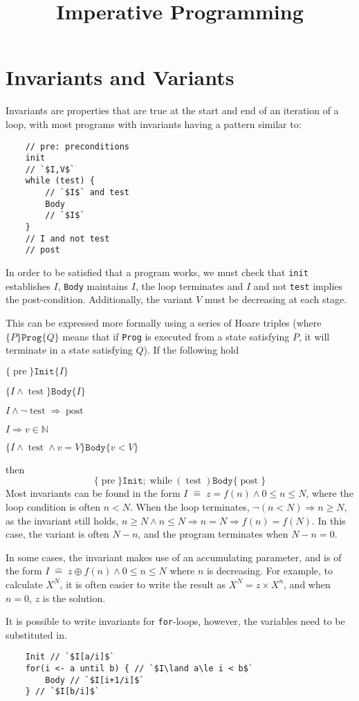 \documentclass[10pt]{article}
\title{Imperative Programming}
\date{}\author{}
\newcommand{\ieq}{\;\hat{=}\;}
\begin{document}
\twocolumn\maketitle
\tableofcontents\listofalgorithms
\section{Invariants and Variants}
Invariants are properties that are true at the start and end of an iteration of a loop, with most programs with invariants having a pattern similar to:
\begin{lstlisting}
	// pre: preconditions
	init
	// `$I,V$`
	while (test) {
		// `$I$` and test
		Body
		// `$I$`
	}
	// I and not test
	// post
\end{lstlisting}
In order to be satisfied that a program works, we must check that \texttt{init} establishes $I$, \texttt{Body} maintains $I$, the loop terminates and $I$ and not \texttt{test} implies the post-condition.  Additionally, the variant $V$ must be decreasing at each stage.

This can be expressed more formally using a series of Hoare triples (where $\{P\}\texttt{Prog}\{Q\}$ means that if \texttt{Prog} is executed from a state satisfying $P$, it will terminate in a state satisfying $Q$).  If the following hold
\begin{itemize*}
	\item $\{\mathop{pre}\}\texttt{Init}\{I\}$
	\item $\{I\land \mathop{test}\}\texttt{Body}\{I\}$
	\item $I\land\lnot\mathop{test}\Rightarrow\mathop{post}$
	\item $I\Rightarrow v\in\mathbb N$
	\item $\{I\land\mathop{test}\land v=V\}\texttt{Body}\{v<V\}$
\end{itemize*}
then \[\{\mathop{pre}\}\texttt{Init};\mathop{while}(\mathop{test})\texttt{Body}\{\mathop{post}\}\]
Most invariants can be found in the form $I\ieq z=f(n)\land0\le n\le N$, where the loop condition is often $n<N$.  When the loop terminates, $\lnot(n<N)\Rightarrow n\ge N$, as the invariant still holds, $n\ge N\land n\le N\Rightarrow n=N\Rightarrow f(n)=f(N)$.  In this case, the variant is often $N-n$, and the program terminates when $N-n=0$.

In some cases, the invariant makes use of an accumulating parameter, and is of the form $I\ieq z\oplus f(n)\land 0\le n \le N$ where $n$ is decreasing.  For example, to calculate $X^N$, it is often easier to write the result as $X^N=z\times X^n$, and when $n=0$, $z$ is the solution.

It is possible to write invariants for \texttt{for}-loops, however, the variables need to be substituted in.
\begin{lstlisting}
	Init // `$I[a/i]$`
	for(i <- a until b) { // `$I\land a\le i < b$`
		Body // `$I[i+1/i]$`
	} // `$I[b/i]$`
\end{lstlisting}
\end{document}
